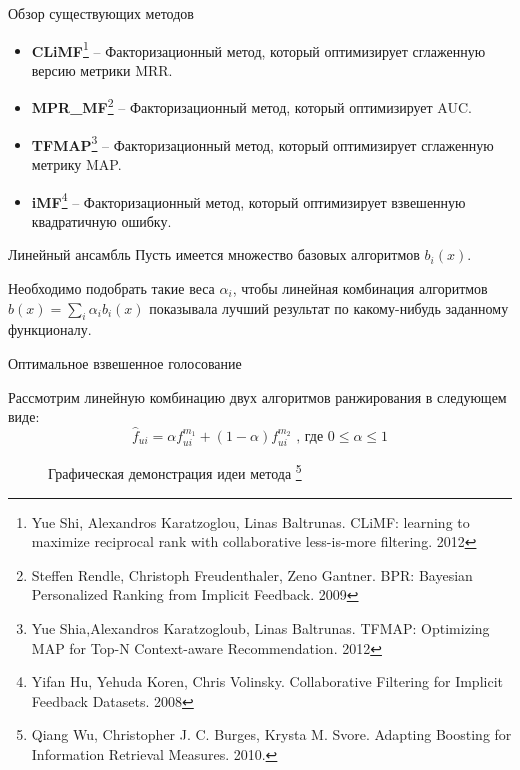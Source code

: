 \documentclass[10pt,pdf,hyperref={unicode}]{beamer}
\begin{document}
\begin{frame}{Обзор существующих методов}

\begin{itemize}
\item \textbf{CLiMF}\footnote{Yue Shi, Alexandros Karatzoglou, Linas Baltrunas.
CLiMF: learning to maximize reciprocal rank with collaborative less-is-more filtering. 2012}
 -- Факторизационный метод, который оптимизирует сглаженную версию метрики MRR.
  	
\item \textbf{MPR\_MF}\footnote{Steffen Rendle, Christoph Freudenthaler, Zeno Gantner.    
         BPR: Bayesian Personalized Ranking from Implicit Feedback. 2009}
-- Факторизационный метод, который оптимизирует AUC.
\item \textbf{TFMAP}\footnote{Yue Shia,Alexandros Karatzogloub, Linas Baltrunas.
TFMAP: Optimizing MAP for Top-N Context-aware Recommendation. 2012} 
-- Факторизационный метод, который оптимизирует сглаженную метрику MAP.
\item \textbf{iMF}\footnote{Yifan Hu, Yehuda Koren, Chris Volinsky.
	Collaborative Filtering for Implicit Feedback Datasets. 2008}
-- Факторизационный метод, который оптимизирует взвешенную квадратичную ошибку.
\end{itemize}
\end{frame}

\begin{frame}{Линейный ансамбль}
Пусть имеется множество базовых алгоритмов $b_i(x)$. 

Необходимо подобрать такие веса $\alpha_i$, чтобы линейная комбинация алгоритмов $\hat{b}(x) = \sum_i \alpha_i b_i(x)$ показывала лучший результат по какому-нибудь заданному функционалу. 
\end{frame}

\begin{frame}{Оптимальное взвешенное голосование}

 Рассмотрим линейную комбинацию двух алгоритмов ранжирования  в следующем виде:
\begin{equation*}
	\hat{f}_{ui} = \alpha f_{ui}^{m_1} + (1 - \alpha) f_{ui} ^ {m_2} \textrm{\ , где $0 \leq \alpha \leq 1$}
\end{equation*} 
	
\begin{figure}[h]
\caption{Графическая демонстрация идеи метода \footnote{Qiang Wu, Christopher J. C. Burges, Krysta M. Svore.	 Adapting Boosting for Information Retrieval Measures. 2010.}}
\label{pic:latexpic}
\end{figure}

\end{frame}
\end{document}
